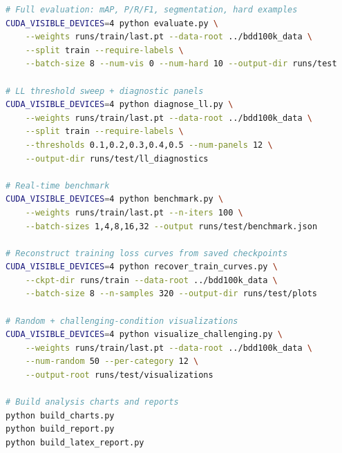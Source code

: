 \documentclass[12pt,a4paper]{report}
\begin{document}
\begin{lstlisting}[language=bash]
# Full evaluation: mAP, P/R/F1, segmentation, hard examples
CUDA_VISIBLE_DEVICES=4 python evaluate.py \
    --weights runs/train/last.pt --data-root ../bdd100k_data \
    --split train --require-labels \
    --batch-size 8 --num-vis 0 --num-hard 10 --output-dir runs/test

# LL threshold sweep + diagnostic panels
CUDA_VISIBLE_DEVICES=4 python diagnose_ll.py \
    --weights runs/train/last.pt --data-root ../bdd100k_data \
    --split train --require-labels \
    --thresholds 0.1,0.2,0.3,0.4,0.5 --num-panels 12 \
    --output-dir runs/test/ll_diagnostics

# Real-time benchmark
CUDA_VISIBLE_DEVICES=4 python benchmark.py \
    --weights runs/train/last.pt --n-iters 100 \
    --batch-sizes 1,4,8,16,32 --output runs/test/benchmark.json

# Reconstruct training loss curves from saved checkpoints
CUDA_VISIBLE_DEVICES=4 python recover_train_curves.py \
    --ckpt-dir runs/train --data-root ../bdd100k_data \
    --batch-size 8 --n-samples 320 --output-dir runs/test/plots

# Random + challenging-condition visualizations
CUDA_VISIBLE_DEVICES=4 python visualize_challenging.py \
    --weights runs/train/last.pt --data-root ../bdd100k_data \
    --num-random 50 --per-category 12 \
    --output-root runs/test/visualizations

# Build analysis charts and reports
python build_charts.py
python build_report.py
python build_latex_report.py
\end{lstlisting}
\end{document}
